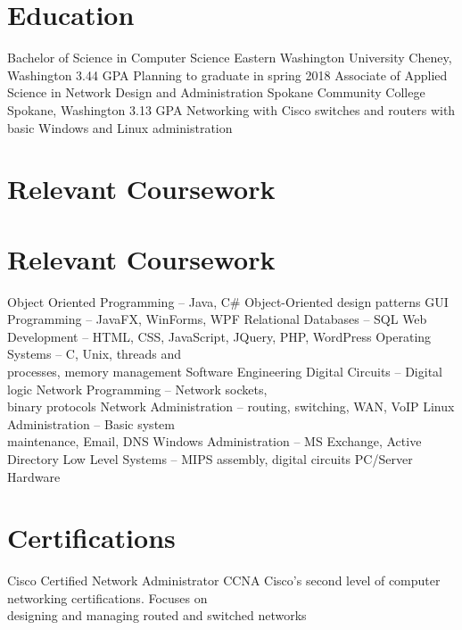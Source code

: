 \documentclass[11pt,letterpaper,sans]{moderncv}
\begin{document}
\makecvtitle{}


\section{Education}
	{Bachelor of Science in Computer Science}
	{Eastern Washington University}
	{Cheney, Washington}
	{3.44 GPA}
	{Planning to graduate in spring 2018}
	{Associate of Applied Science in Network Design and Administration}
	{Spokane Community College}
	{Spokane, Washington}
	{3.13 GPA}
	{Networking with Cisco switches and routers with basic Windows and Linux
	administration}


\section{Relevant Coursework}
\section{Relevant Coursework}
\cvlistdoubleitem %
	{Object Oriented Programming -- Java, C\#} %
	{Object-Oriented design patterns}
\cvlistdoubleitem %
	{GUI Programming -- JavaFX, WinForms, WPF} %
	{Relational Databases -- SQL} %
\cvlistdoubleitem %
	{Web Development -- HTML, CSS, JavaScript, JQuery, PHP, WordPress} %
	{Operating Systems -- C, Unix, threads and\\ processes, memory management} %
\cvlistdoubleitem %
	{Software Engineering} %
	{Digital Circuits -- Digital logic} %
\cvlistdoubleitem %
	{Network Programming -- Network sockets,\\ binary protocols} %
	{Network Administration -- routing, switching, WAN, VoIP} %
\cvlistdoubleitem %
	{Linux Administration -- Basic system\\ maintenance, Email, DNS} %
	{Windows Administration -- MS Exchange, Active Directory} %
\cvlistdoubleitem %
	{Low Level Systems -- MIPS assembly, digital circuits} %
	{PC/Server Hardware}


\section{Certifications}
	{Cisco Certified Network Administrator}
	{CCNA}
	{}
	{}
	{Cisco's second level of computer networking certifications. Focuses on\\
	designing and managing routed and switched networks}



\clearpage

\end{document}
